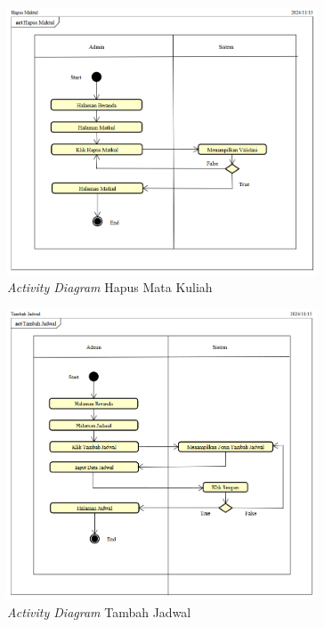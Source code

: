 \begin{figure}
	\centering
	\includegraphics[width=0.82\textwidth]{konten/gambar/activity-diagram/hapus-matkul.png}
	\caption{\textit{Activity Diagram} Hapus Mata Kuliah}
	\label{activity-diagram-hapus-matkul}
\end{figure}

\begin{figure}
	\centering
	\includegraphics[width=0.82\textwidth]{konten/gambar/activity-diagram/tambah-jadwal.png}
	\caption{\textit{Activity Diagram} Tambah Jadwal}
	\label{activity-diagram-tambah-jadwal}
\end{figure}

